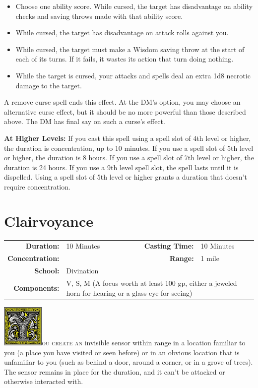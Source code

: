 \documentclass[12pt,showtrims]{memoir}
\begin{document}
\begin{itemize}
\item Choose one ability score. While cursed, the target has disadvantage on ability checks and saving throws made with that ability score.
\item While cursed, the target has disadvantage on attack rolls against you.
\item While cursed, the target must make a Wisdom saving throw at the start of each of its turns. If it fails, it wastes its action that turn doing nothing.
\item While the target is cursed, your attacks and spells deal an extra 1d8 necrotic damage to the target.
\end{itemize}

\noindent
A remove curse spell ends this effect. At the DM's option, you may choose an alternative curse effect, but it should be no more powerful than those described above. The DM has final say on such a curse's effect.

\vspace{8pt} \noindent\textbf{At Higher Levels:} If you cast this spell using a spell slot of 4th level or higher, the duration is concentration, up to 10 minutes. If you use a spell slot of 5th level or higher, the duration is 8 hours. If you use a spell slot of 7th level or higher, the duration is 24 hours. If you use a 9th level spell slot, the spell lasts until it is dispelled. Using a spell slot of 5th level or higher grants a duration that doesn't require concentration. 
\newpage

\section*{Clairvoyance}
{
\small\centering\vspace{-6pt}
\begin{tabular}{rlrl}
\toprule
\textbf{Duration:} & 10 Minutes &
\textbf{Casting Time:} & 10 Minutes \\
\textbf{Concentration:} & &
\textbf{Range:} & 1 mile \\
\textbf{School:} & Divination \\
\textbf{Components:} & \multicolumn{3}{p{0.7\textwidth}}{V, S, M (A focus worth at least 100 gp, either a jeweled horn for hearing or a glass eye for seeing)}\\
\bottomrule
\end{tabular}
}
\vspace{1\baselineskip}\noindent
\lettrine[lines=4]{\includegraphics[height=58pt]{initials/Y.png}}{ou create an} invisible sensor within range in a location familiar to you (a place you have visited or seen before) or in an obvious location that is unfamiliar to you (such as behind a door, around a corner, or in a grove of trees). The sensor remains in place for the duration, and it can't be attacked or otherwise interacted with.
\end{document}
